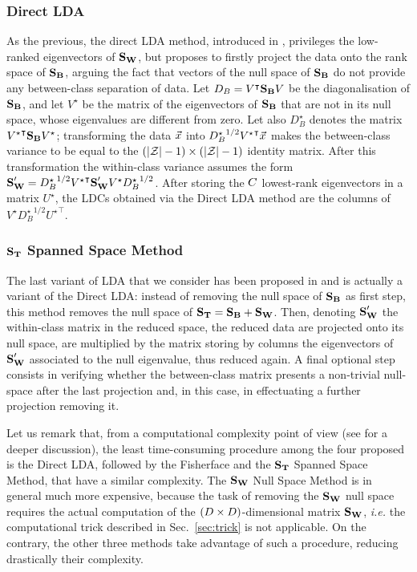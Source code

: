 \subsubsection{Direct LDA}
As the previous, the direct LDA method, introduced in \cite{Yu01adirect}, privileges the low-ranked eigenvectors of $\textbf{S}_{\textbf{W}}$, but proposes to firstly project the data onto the rank space of $\textbf{S}_{\textbf{B}}$, arguing the fact that vectors of the null space of $\textbf{S}_{\textbf{B}}$ do not provide any between-class separation of data. Let $D_B=V^\intercal\textbf{S}_{\textbf{B}} V$ be the diagonalisation of $\textbf{S}_{\textbf{B}}$, and let $V^\star$ be the matrix of the eigenvectors of $\textbf{S}_{\textbf{B}}$ that are not in its null space, \ie whose eigenvalues are different from zero. Let also $D_B^\star$ denotes the matrix ${V^\star}^\intercal\textbf{S}_{\textbf{B}} V^\star$; transforming the data $\vec{x}$ into ${D_B^\star}^{1/2}{V^\star}^\intercal\vec{x}$ makes the between-class variance to be equal to   the $(\lvert\mathcal{Z}\rvert - 1) \times (\lvert\mathcal{Z}\rvert- 1)$ identity matrix. After this transformation the within-class variance assumes the form $\textbf{S}_{\textbf{W}}' = {D_B^\star}^{1/2}{V^\star}^\intercal\textbf{S}_{\textbf{W}} ' V^\star {D_B^\star}^{1/2}$. After storing the $C$ lowest-rank eigenvectors in a matrix $U^\star$, the LDCs obtained via the Direct LDA method are the columns of $V^\star{D_B^\star}^{1/2}{U^\star}^\intercal$. 


\subsubsection{$\textbf{S}_{\textbf{T}}$ Spanned Space Method}
The last variant of LDA that we consider has been proposed in \cite{huang} and is actually a variant of the Direct LDA: instead of removing the null space of $\textbf{S}_{\textbf{B}}$ as first step, this method removes the null space of $\textbf{S}_{\textbf{T}} = \textbf{S}_{\textbf{B}} + \textbf{S}_{\textbf{W}}$. Then, denoting $\textbf{S}_{\textbf{W}}'$ the within-class matrix in the reduced space, the reduced data are projected onto its null space, \ie are multiplied by the matrix storing by columns the eigenvectors of $\textbf{S}_{\textbf{W}}'$ associated to the null eigenvalue, thus reduced again. A final optional step consists in verifying whether  the between-class matrix presents a non-trivial null-space after the last projection and, in this case, in effectuating a further projection removing it.

\begin{remark}
Let us remark that, from a computational complexity point of view (see \cite{huang} for a deeper discussion), the least time-consuming procedure among the four proposed is the Direct LDA, followed by the Fisherface and the $\textbf{S}_{\textbf{T}}$ Spanned Space Method, that have a similar complexity. The $\textbf{S}_{\textbf{W}}$ Null Space Method is in general much more expensive, because the task of removing the $\textbf{S}_{\textbf{W}}$ null space requires the actual computation of the $(D\times D)$-dimensional matrix $\textbf{S}_{\textbf{W}}$, {\em i.e.} the computational trick  described in Sec.~\ref{sec:trick} is not applicable. On the contrary, the other three methods take advantage of such a procedure, reducing drastically their complexity.
\end{remark}



